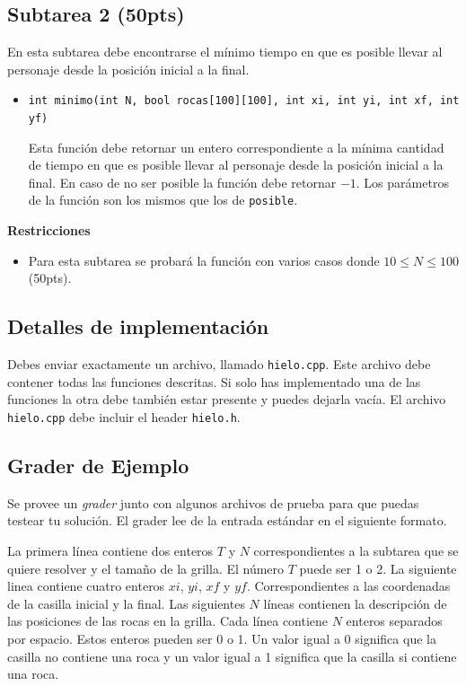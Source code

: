 \documentclass{oci}
\begin{document}
\subsection*{Subtarea 2 (50pts)}
En esta subtarea debe encontrarse el mínimo tiempo en que es posible llevar al personaje desde la posición inicial a la final.

\begin{itemize}
	\item \verb+int minimo(int N, bool rocas[100][100], int xi, int yi, int xf, int yf)+

	Esta función debe retornar un entero correspondiente a la mínima cantidad de tiempo en que es posible llevar al personaje desde la posición inicial a la final.
  En caso de no ser posible la función debe retornar $-1$.
  Los parámetros de la función son los mismos que los de \verb+posible+.
\end{itemize}
\vspace{-0.55em}
{\bf Restricciones}
\vspace{-1em}
\begin{itemize}
\item Para esta subtarea se probará la función con varios casos donde $10 \leq N\leq 100$ (50pts).
\end{itemize}

\subsection*{Detalles de implementación}
Debes enviar exactamente un archivo, llamado \verb+hielo.cpp+.
Este archivo debe contener todas las funciones descritas.
Si solo has implementado una de las funciones la otra debe también estar presente y puedes dejarla vacía.
El archivo \verb+hielo.cpp+ debe incluir el header \verb+hielo.h+.

\subsection*{Grader de Ejemplo}
Se provee un \emph{grader} junto con algunos archivos de prueba para que puedas testear tu solución.
El grader lee de la entrada estándar en el siguiente formato.

La primera línea contiene dos enteros $T$ y $N$ correspondientes a la subtarea que se quiere resolver y el tamaño de la grilla.
El número $T$ puede ser 1 o 2.
La siguiente linea contiene cuatro enteros $xi$, $yi$, $xf$ y $yf$.
Correspondientes a las coordenadas de la casilla inicial y la final.
Las siguientes $N$ líneas contienen la descripción de las posiciones de las rocas en la grilla.
Cada línea contiene $N$ enteros separados por espacio.
Estos enteros pueden ser 0 o 1.
Un valor igual a 0 significa que la casilla no contiene una roca y un valor igual a 1 significa que la casilla si contiene una roca.
\end{document}
